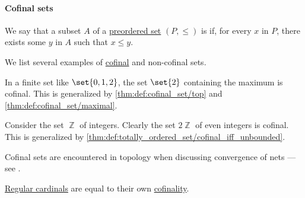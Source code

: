 \paragraph{Cofinal sets}

\begin{definition}\label{def:cofinal_set}
  We say that a subset \( A \) of a \hyperref[def:partially_ordered_set]{preordered set} \( (P, \leq) \) is  if, for every \( x \) in \( P \), there exists some \( y \) in \( A \) such that \( x \leq y \).
\end{definition}

\begin{example}\label{ex:def:cofinal_set}
  We list several examples of \hyperref[def:cofinal_set]{cofinal} and non-cofinal sets.

  \begin{thmenum}
     In a finite set like \( \set{ 0, 1, 2 } \), the set \( \set{ 2 } \) containing the maximum is cofinal. This is generalized by \cref{thm:def:cofinal_set/top} and \cref{thm:def:cofinal_set/maximal}.

     Consider the set \( \BbbZ \) of integers. Clearly the set \( 2\BbbZ \) of even integers is cofinal. This is generalized by \cref{thm:def:totally_ordered_set/cofinal_iff_unbounded}.

     Cofinal sets are encountered in topology when discussing convergence of nets --- see .

     \hyperref[def:regular_cardinal]{Regular cardinals} are equal to their own \hyperref[def:cofinality]{cofinality}.
  \end{thmenum}
\end{example}

